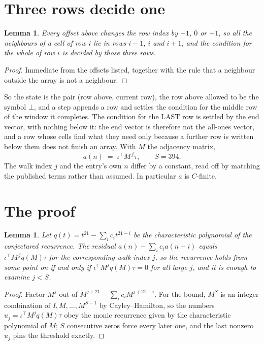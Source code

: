 \documentclass[11pt,a4paper]{article}
\theoremstyle{plain}
\newtheorem{lemma}[theorem]{Lemma}
\theoremstyle{definition}
\begin{document}
\section{Three rows decide one}

\begin{lemma}\label{lem:win}
Every offset above changes the row index by $-1$, $0$ or $+1$, so all the neighbours of a cell
of row $i$ lie in rows $i-1$, $i$ and $i+1$, and the condition for the whole of row $i$ is
decided by those three rows.
\end{lemma}

\begin{proof}
Immediate from the offsets listed, together with the rule that a neighbour outside the array is
not a neighbour.
\end{proof}

So the state is the pair (row above, current row), the row above allowed to be the symbol
$\bot$, and a step appends a row and settles the condition for the middle row of the window it
completes. The condition for the LAST row is settled by the end vector, with nothing below it:
the end vector is therefore not the all-ones vector, and a row whose cells find what they need
only because a further row is written below them does not finish an array. With $M$ the
adjacency matrix,
\[
a(n)\;=\;\iota^{\!\top}M^{\,j}\tau ,\qquad S=394.
\]
The walk index $j$ and the entry's own $n$ differ by a constant, read off by matching the
published terms rather than assumed. In particular $a$ is $C$-finite.

\section{The proof}

\begin{lemma}\label{lem:crit}
Let $q(t)=t^{21}-\sum_i c_it^{21-i}$ be the characteristic polynomial of the
conjectured recurrence. The residual $a(n)-\sum_ic_ia(n-i)$ equals
$\iota^{\!\top}M^{\,j}q(M)\tau$ for the corresponding walk index $j$, so the recurrence
holds from some point on if and only if $\iota^{\!\top}M^{j}q(M)\tau=0$ for all large $j$,
and it is enough to examine $j<S$.
\end{lemma}

\begin{proof}
Factor $M^{j}$ out of $M^{j+21}-\sum_ic_iM^{j+21-i}$. For the bound, $M^{S}$
is an integer combination of $I,M,\dots,M^{S-1}$ by Cayley--Hamilton, so the numbers
$u_j=\iota^{\!\top}M^{j}q(M)\tau$ obey the monic recurrence given by the characteristic
polynomial of $M$; $S$ consecutive zeros force every later one, and the last nonzero $u_j$
pins the threshold exactly.
\end{proof}
\end{document}
